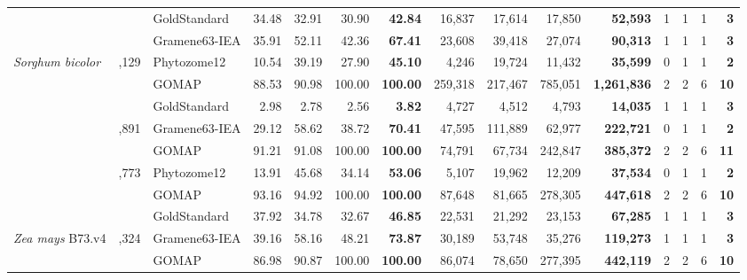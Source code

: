 \documentclass[utf8]{frontiersSCNS}
\begin{document}
\begin{table}[t]
{\begin{threeparttable}
\begin{tabular}{lrlrrr>{\bfseries}r|rrr>{\bfseries}r|rrr>{\bfseries}r}
 &  & GoldStandard & 34.48 & 32.91 & 30.90 & 42.84 & 16,837 & 17,614 & 17,850 & 52,593 & 1 & 1 & 1 & 3\\

\rowcolor{gray!6}   &  & Gramene63-IEA & 35.91 & 52.11 & 42.36 & 67.41 & 23,608 & 39,418 & 27,074 & 90,313 & 1 & 1 & 1 & 3\\

\multirow{-4}{*}{\raggedright\arraybackslash \textit{Sorghum bicolor}} & \multirow{-4}{*}{\raggedleft\arraybackslash 34,129} & Phytozome12 & 10.54 & 39.19 & 27.90 & 45.10 & 4,246 & 19,724 & 11,432 & 35,599 & 0 & 1 & 1 & 2\\
\cmidrule{1-15}
\rowcolor{gray!6}   &  & GOMAP & 88.53 & 90.98 & 100.00 & 100.00 & 259,318 & 217,467 & 785,051 & 1,261,836 & 2 & 2 & 6 & 10\\

 &  & GoldStandard & 2.98 & 2.78 & 2.56 & 3.82 & 4,727 & 4,512 & 4,793 & 14,035 & 1 & 1 & 1 & 3\\

\rowcolor{gray!6}  \multirow{-3}{*}{\raggedright\arraybackslash \textit{Triticum aestivum}} & \multirow{-3}{*}{\raggedleft\arraybackslash 107,891} & Gramene63-IEA & 29.12 & 58.62 & 38.72 & 70.41 & 47,595 & 111,889 & 62,977 & 222,721 & 0 & 1 & 1 & 2\\
\cmidrule{1-15}
 &  & GOMAP & 91.21 & 91.08 & 100.00 & 100.00 & 74,791 & 67,734 & 242,847 & 385,372 & 2 & 2 & 6 & 11\\

\rowcolor{gray!6}  \multirow{-2}{*}{\raggedright\arraybackslash \textit{Vigna unguiculata}} & \multirow{-2}{*}{\raggedleft\arraybackslash 29,773} & Phytozome12 & 13.91 & 45.68 & 34.14 & 53.06 & 5,107 & 19,962 & 12,209 & 37,534 & 0 & 1 & 1 & 2\\
\cmidrule{1-15}
 &  & GOMAP & 93.16 & 94.92 & 100.00 & 100.00 & 87,648 & 81,665 & 278,305 & 447,618 & 2 & 2 & 6 & 10\\

\rowcolor{gray!6}   &  & GoldStandard & 37.92 & 34.78 & 32.67 & 46.85 & 22,531 & 21,292 & 23,153 & 67,285 & 1 & 1 & 1 & 3\\

\multirow{-3}{*}{\raggedright\arraybackslash \textit{Zea mays} B73.v4} & \multirow{-3}{*}{\raggedleft\arraybackslash 39,324} & Gramene63-IEA & 39.16 & 58.16 & 48.21 & 73.87 & 30,189 & 53,748 & 35,276 & 119,273 & 1 & 1 & 1 & 3\\
\cmidrule{1-15}
\rowcolor{gray!6}   &  & GOMAP & 86.98 & 90.87 & 100.00 & 100.00 & 86,074 & 78,650 & 277,395 & 442,119 & 2 & 2 & 6 & 10\\


\end{tabular}
\end{threeparttable}}
\end{table}
\end{document}
